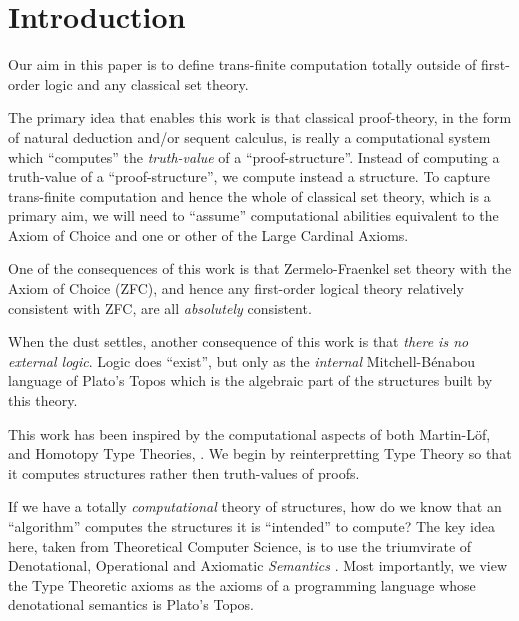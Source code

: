 
\section{Introduction}

Our aim in this paper is to define trans-finite computation totally outside of
first-order logic and any classical set theory.

The primary idea that enables this work is that classical proof-theory, in the
form of natural deduction and/or sequent calculus, is really a computational
system which ``computes'' the \emph{truth-value} of a ``proof-structure''.
Instead of computing a truth-value of a ``proof-structure'', we compute instead
a structure. To capture trans-finite computation and hence the whole of
classical set theory, which is a primary aim, we will need to ``assume''
computational abilities equivalent to the Axiom of Choice and one or other of
the Large Cardinal Axioms.

One of the consequences of this work is that Zermelo-Fraenkel set theory with
the Axiom of Choice (ZFC), and hence any first-order logical theory relatively
consistent with ZFC, are all \emph{absolutely} consistent.

When the dust settles, another consequence of this work is that \emph{there is no
\emph{external} logic}. Logic does ``exist'', but only as the \emph{internal}
Mitchell-B\'enabou language of Plato's Topos which is the algebraic part of the
structures built by this theory.

This work has been inspired by the computational aspects of both Martin-L\"of,
\cite{martinLofSambin1984typeTh, nordstromPeterssonSmith1990typeTh,
thompson1991typeTh, nordstromPeterssonSmith2000typeTh} and Homotopy Type
Theories, \cite{awodeyCoquandVoevodsky2013homotopyTypeTheory}. We begin by
reinterpretting Type Theory so that it computes structures rather then
truth-values of proofs. 

If we have a totally \emph{computational} theory of structures, how do we know
that an ``algorithm'' computes the structures it is ``intended'' to compute? The
key idea here, taken from Theoretical Computer Science, is to use the
triumvirate of Denotational, Operational and Axiomatic \emph{Semantics}
\cite{gunter1992semainticProgrammingLanguages,
winskel1993formalSemanticsProgrammingLanguages, gries1981scienceProgramming}.
Most importantly, we view the Type Theoretic axioms as the axioms of a
programming language whose denotational semantics is Plato's Topos.

